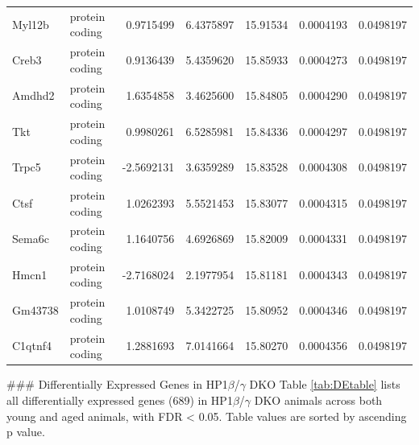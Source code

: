 \documentclass[onehalf,12pt]{beavtex}
\begin{document}
\begin{longtable}{llrrrrr}
  Myl12b & protein coding & 0.9715499 & 6.4375897 & 15.91534 & 0.0004193 & 0.0498197\\
  \addlinespace
  Creb3 & protein coding & 0.9136439 & 5.4359620 & 15.85933 & 0.0004273 & 0.0498197\\
  Amdhd2 & protein coding & 1.6354858 & 3.4625600 & 15.84805 & 0.0004290 & 0.0498197\\
  Tkt & protein coding & 0.9980261 & 6.5285981 & 15.84336 & 0.0004297 & 0.0498197\\
  Trpc5 & protein coding & -2.5692131 & 3.6359289 & 15.83528 & 0.0004308 & 0.0498197\\
  Ctsf & protein coding & 1.0262393 & 5.5521453 & 15.83077 & 0.0004315 & 0.0498197\\
  \addlinespace
  Sema6c & protein coding & 1.1640756 & 4.6926869 & 15.82009 & 0.0004331 & 0.0498197\\
  Hmcn1 & protein coding & -2.7168024 & 2.1977954 & 15.81181 & 0.0004343 & 0.0498197\\
  Gm43738 & protein coding & 1.0108749 & 5.3422725 & 15.80952 & 0.0004346 & 0.0498197\\
  C1qtnf4 & protein coding & 1.2881693 & 7.0141664 & 15.80270 & 0.0004356 & 0.0498197\\*
  \end{longtable}
  
  \endgroup{}
  
  \clearpage
  \#\#\# Differentially Expressed Genes in HP1\(\beta\)/\(\gamma\) DKO
  Table \ref{tab:DEtable} lists all differentially expressed genes (689)
  in HP1\(\beta\)/\(\gamma\) DKO animals across both young and aged
  animals, with FDR \textless{} 0.05. Table values are sorted by ascending
  p value.
  
  \begingroup\fontsize{8}{10}\selectfont
  
\end{document}
